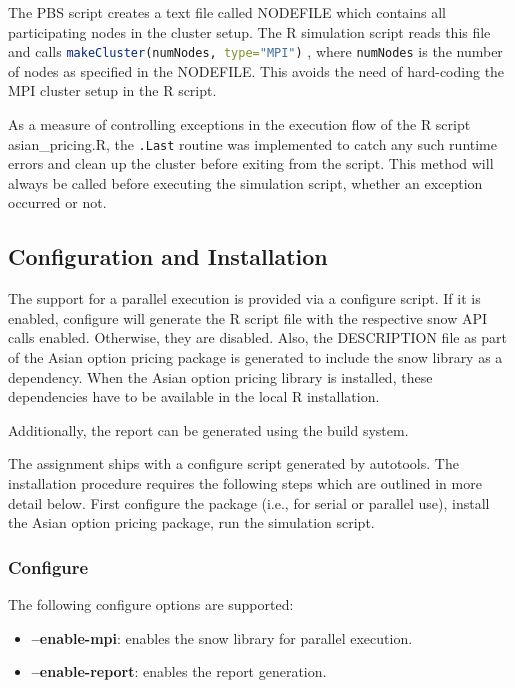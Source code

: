 \documentclass[12pt,a4paper]{article}
\def\rcode#1{
  \lstinline[basicstyle=\ttfamily,language=R]{#1} }
\begin{document}
The PBS script creates a text file called NODEFILE which contains all
participating nodes in the cluster setup. The R simulation script
reads this file and calls \rcode{makeCluster(numNodes, type="MPI")},
where \rcode{numNodes} is the number of nodes as specified in the
NODEFILE. This avoids the need of hard-coding the MPI cluster setup in
the R script.

As a measure of controlling exceptions in the execution flow of the R
script asian\_pricing.R, the \rcode{.Last} routine was implemented to
catch any such runtime errors and clean up the cluster before exiting
from the script. This method will always be called before executing
the simulation script, whether an exception occurred or not.

\subsection{Configuration and Installation}
\label{sec:conf-r-pack}

The support for a parallel execution is provided via a configure
script. If it is enabled, configure will generate the R script file
with the respective snow API calls enabled. Otherwise, they are
disabled. Also, the DESCRIPTION file as part of the Asian option
pricing package is generated to include the snow library as a
dependency. When the Asian option pricing library is installed, these
dependencies have to be available in the local R installation.

Additionally, the report can be generated using the build system.

The assignment ships with a configure script generated by
autotools. The installation procedure requires the following steps
which are outlined in more detail below. First configure the package
(i.e., for serial or parallel use), install the Asian option pricing
package, run the simulation script.

\subsubsection{Configure}
\label{sec:configure}

The following configure options are supported:

\begin{itemize}
  \item \textbf{--enable-mpi}: enables the snow library for parallel
    execution.
  \item \textbf{--enable-report}: enables the report generation.
\end{itemize}
\end{document}
